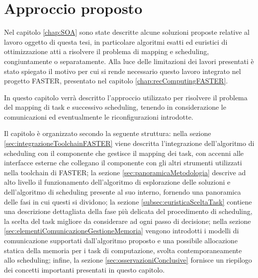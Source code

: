 \chapter{Approccio proposto}
\label{chap:approccio}
\vspace{1cm}
Nel capitolo \ref{chap:SOA} sono state descritte alcune soluzioni proposte 
relative al lavoro oggetto di questa tesi, in particolare algoritmi esatti ed
euristici di ottimizzazione atti a risolvere il problema di mapping e 
scheduling, congiuntamente o separatamente. Alla luce delle limitazioni dei 
lavori presentati è stato spiegato il motivo per cui si rende necessario questo 
lavoro integrato nel progetto \ac{FASTER}, presentato nel capitolo
\ref{chap:recComputingFASTER}.


In questo capitolo verrà descritto l'approccio utilizzato per risolvere il 
problema del mapping di task e successivo scheduling, tenendo in considerazione le comunicazioni ed
eventualmente le riconfigurazioni introdotte.

Il capitolo è organizzato secondo la seguente struttura: nella sezione 
\ref{sec:integrazioneToolchainFASTER} viene descritta l'integrazione 
dell'algoritmo di scheduling con il componente che gestisce il mapping dei task, 
con accenni alle interfacce esterne che collegano il componente 
con gli altri strumenti utilizzati nella toolchain di \acs{FASTER}; la sezione 
\ref{sec:panoramicaMetodologia} descrive ad alto livello il funzionamento 
dell'algoritmo di esplorazione delle soluzioni e dell'algoritmo di scheduling
presente al suo interno, fornendo una panoramica delle fasi in cui questi si dividono;
la sezione \ref{subsec:euristicaSceltaTask} contiene una descrizione 
dettagliata della fase più delicata del procedimento di scheduling, la scelta 
del task migliore da considerare ad ogni passo di decisione; nella sezione 
\ref{sec:elementiComunicazioneGestioneMemoria} vengono introdotti i modelli di 
comunicazione supportati dall'algoritmo proposto e una possibile allocazione 
statica della memoria per i task di computazione, svolta contemporaneamente allo 
scheduling; infine, la sezione \ref{sec:osservazioniConclusive} fornisce un 
riepilogo dei concetti importanti presentati in questo capitolo.


